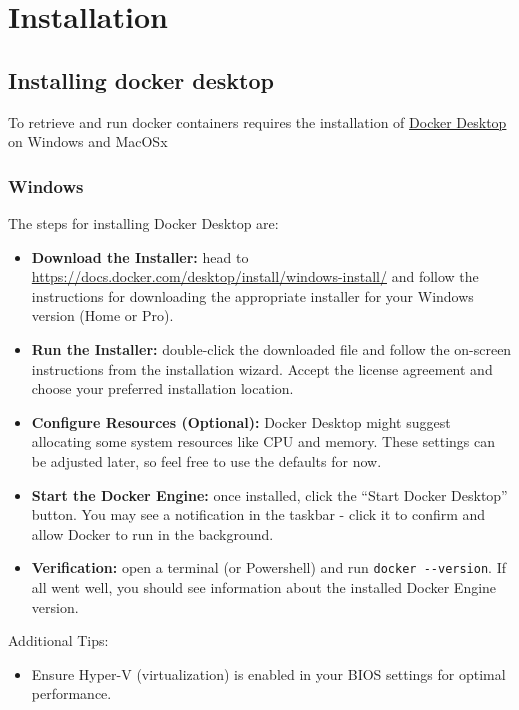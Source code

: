 \documentclass[
  8pt,
  a4paper]{article}
\providecommand{\tightlist}{%
  \setlength{\itemsep}{0pt}\setlength{\parskip}{0pt}}
\begin{document}
\section{Installation}\label{installation}

\subsection{Installing docker desktop}\label{installing-docker-desktop}

To retrieve and run docker containers requires the installation of
\href{https://www.docker.com/products/docker-desktop/}{Docker Desktop}
on Windows and MacOSx

\subsubsection{Windows}\label{windows}

The steps for installing Docker Desktop are:

\begin{itemize}
\item
  \textbf{Download the Installer:} head to
  \url{https://docs.docker.com/desktop/install/windows-install/} and
  follow the instructions for downloading the appropriate installer for
  your Windows version (Home or Pro).
\item
  \textbf{Run the Installer:} double-click the downloaded file and
  follow the on-screen instructions from the installation wizard. Accept
  the license agreement and choose your preferred installation location.
\item
  \textbf{Configure Resources (Optional):} Docker Desktop might suggest
  allocating some system resources like CPU and memory. These settings
  can be adjusted later, so feel free to use the defaults for now.
\item
  \textbf{Start the Docker Engine:} once installed, click the ``Start
  Docker Desktop'' button. You may see a notification in the taskbar -
  click it to confirm and allow Docker to run in the background.
\item
  \textbf{Verification:} open a terminal (or Powershell) and run
  \texttt{docker\ -\/-version}. If all went well, you should see
  information about the installed Docker Engine version.
\end{itemize}

Additional Tips:

\begin{itemize}
\tightlist
\item
  Ensure Hyper-V (virtualization) is enabled in your BIOS settings for
  optimal performance.
\end{itemize}
\end{document}
